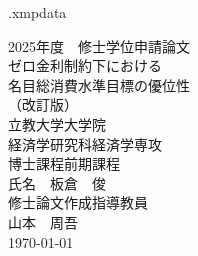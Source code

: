 
\begin{filecontents*}{\jobname.xmpdata}
\end{filecontents*}





\begin{titlepage}
    \centering
    \vspace*{10mm}
    {\Large 2025年度　修士学位申請論文} \\
    \vfill %
    {\huge ゼロ金利制約下における \\ 名目総消費水準目標の優位性} \\
    \vspace{1em}
    {\Large （改訂版）} \\
    \vfill
    {\Large 立教大学大学院 \\ 経済学研究科経済学専攻 \\ 博士課程前期課程} \\
    \vfill
    {\Large 氏名　板倉　俊} \\
    \vfill
    {\Large 修士論文作成指導教員} \\
    {\Large 山本　周吾} \\ 
    \vfill %
    {\Large \today} %
    \vspace*{10mm} %
\end{titlepage}

\clearpage


\begin{abstract}
\setlength{\parindent}{0em}
\setlength{\parskip}{1em}
\noindent

\end{abstract}
\clearpage


\clearpage

\tableofcontents
\clearpage

\setcounter{page}{1}









\printbibliography[title=参考文献]

\appendix


